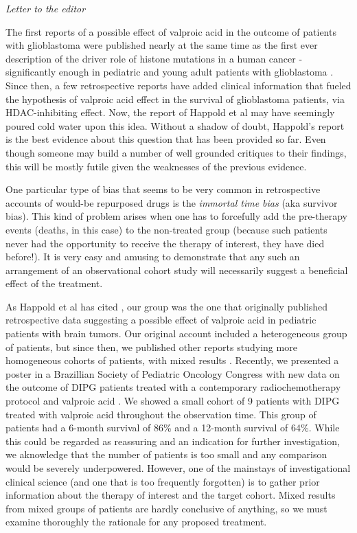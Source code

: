\textit{Letter to the editor} 

The first reports \cite{Happold_2016} of a possible effect of valproic acid in the outcome of patients with glioblastoma were published nearly at the same time as the first ever description of the driver role of histone mutations in a human cancer - significantly enough in pediatric and young adult patients with glioblastoma \cite{Schwartzentruber_2012}. Since then, a few retrospective reports have added clinical information that fueled the hypothesis of valproic acid effect in the survival of glioblastoma patients, via HDAC-inhibiting effect. Now, the report of Happold et al \cite{Happold_2016} may have seemingly poured cold water upon this idea. Without a shadow of doubt, Happold's report is the best evidence about this question that has been provided so far. Even though someone may build a number of well grounded critiques to their findings, this will be mostly futile given the weaknesses of the previous evidence. 

One particular type of bias that seems to be very common in retrospective accounts of would-be repurposed drugs is the \textit{immortal time bias} \cite{Ho_2012} (aka survivor bias). This kind of problem arises when one has to forcefully add the pre-therapy events (deaths, in this case) to the non-treated group (because such patients never had the opportunity to receive the therapy of interest, they have died before!). It is very easy and amusing to demonstrate that any such an arrangement of an observational cohort study will necessarily suggest a beneficial effect of the treatment. 

As Happold et al has cited \cite{Happold_2016}, our group was the one that originally published retrospective data suggesting a possible effect of valproic acid in pediatric patients with brain tumors. Our original account included a heterogeneous group of patients, but since then, we published other reports studying more homogeneous cohorts of patients, with mixed results \cite{Felix_2012}. Recently, we presented a poster in a Brazillian Society of Pediatric Oncology Congress with new data on the outcome of DIPG patients treated with a contemporary radiochemotherapy protocol and valproic acid \cite{59c42273-d778-4fe5-8019-07a0e4509517}. We showed a small cohort of 9 patients with DIPG treated with valproic acid throughout the observation time. This group of patients had a 6-month survival of 86\% and a 12-month survival of 64\%. While this could be regarded as reassuring and an indication for further investigation, we aknowledge that the number of patients is too small and any comparison would be severely underpowered. However, one of the mainstays of investigational clinical science (and one that is too frequently forgotten) is to gather prior information about the therapy of interest and the target cohort. Mixed results from mixed groups of patients are hardly conclusive of anything, so we must examine thoroughly the rationale for any proposed treatment. 

